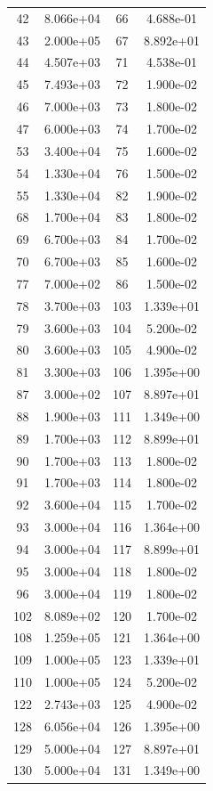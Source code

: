 \documentclass[12pt]{article}
\begin{document}
\begin{longtable}{@{}cccc@{}}
42 & 8.066e+04 & 66 & 4.688e-01 \\
43 & 2.000e+05 & 67 & 8.892e+01 \\
44 & 4.507e+03 & 71 & 4.538e-01 \\
45 & 7.493e+03 & 72 & 1.900e-02 \\
46 & 7.000e+03 & 73 & 1.800e-02 \\
47 & 6.000e+03 & 74 & 1.700e-02 \\
53 & 3.400e+04 & 75 & 1.600e-02 \\
54 & 1.330e+04 & 76 & 1.500e-02 \\
55 & 1.330e+04 & 82 & 1.900e-02 \\
68 & 1.700e+04 & 83 & 1.800e-02 \\
69 & 6.700e+03 & 84 & 1.700e-02 \\
70 & 6.700e+03 & 85 & 1.600e-02 \\
77 & 7.000e+02 & 86 & 1.500e-02 \\
78 & 3.700e+03 & 103 & 1.339e+01 \\
79 & 3.600e+03 & 104 & 5.200e-02 \\
80 & 3.600e+03 & 105 & 4.900e-02 \\
81 & 3.300e+03 & 106 & 1.395e+00 \\
87 & 3.000e+02 & 107 & 8.897e+01 \\
88 & 1.900e+03 & 111 & 1.349e+00 \\
89 & 1.700e+03 & 112 & 8.899e+01 \\
90 & 1.700e+03 & 113 & 1.800e-02 \\
91 & 1.700e+03 & 114 & 1.800e-02 \\
92 & 3.600e+04 & 115 & 1.700e-02 \\
93 & 3.000e+04 & 116 & 1.364e+00 \\
94 & 3.000e+04 & 117 & 8.899e+01 \\
95 & 3.000e+04 & 118 & 1.800e-02 \\
96 & 3.000e+04 & 119 & 1.800e-02 \\
102 & 8.089e+02 & 120 & 1.700e-02 \\
108 & 1.259e+05 & 121 & 1.364e+00 \\
109 & 1.000e+05 & 123 & 1.339e+01 \\
110 & 1.000e+05 & 124 & 5.200e-02 \\
122 & 2.743e+03 & 125 & 4.900e-02 \\
128 & 6.056e+04 & 126 & 1.395e+00 \\
129 & 5.000e+04 & 127 & 8.897e+01 \\
130 & 5.000e+04 & 131 & 1.349e+00 \\

\end{longtable}
\end{document}
